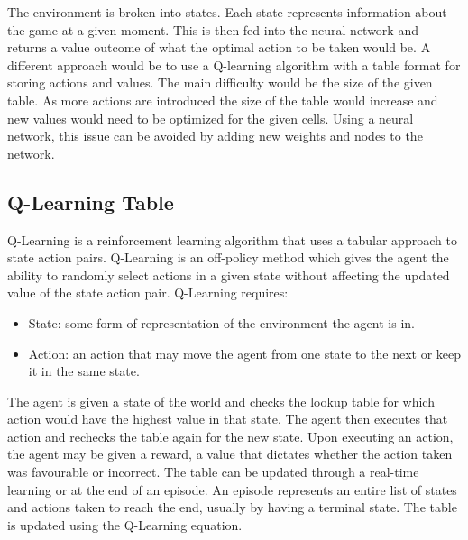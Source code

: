 The environment is broken into states. Each state represents information about
the game at a given moment. This is then fed into the neural network and
returns a value outcome of what the optimal action to be taken would be. A
different approach would be to use a Q-learning algorithm with a table format
for storing actions and values. The main difficulty would be the size of the
given table. As more actions are introduced the size of the table would
increase and new values would need to be optimized for the given cells. Using a
neural network, this issue can be avoided by adding new weights and nodes to the
network.

\subsection{Q-Learning Table}

Q-Learning is a reinforcement learning algorithm that uses a tabular approach to
state action pairs. Q-Learning is an off-policy method which gives the agent the
ability to randomly select actions in a given state without affecting the
updated value of the state action pair. Q-Learning requires:

\begin{itemize}
    \item State: some form of representation of the environment the agent is in.
    \item Action: an action that may move the agent from one state to the next or keep it in the same state.
\end{itemize}

The agent is given a state of the world and checks the lookup table for which
action would have the highest value in that state. The agent then executes that
action and rechecks the table again for the new state. Upon executing an action,
the agent may be given a reward, a value that dictates whether the action taken
was favourable or incorrect. The table can be updated through a real-time
learning or at the end of an episode. An episode represents an entire list of
states and actions taken to reach the end, usually by having a terminal state.
The table is updated using the Q-Learning equation.


